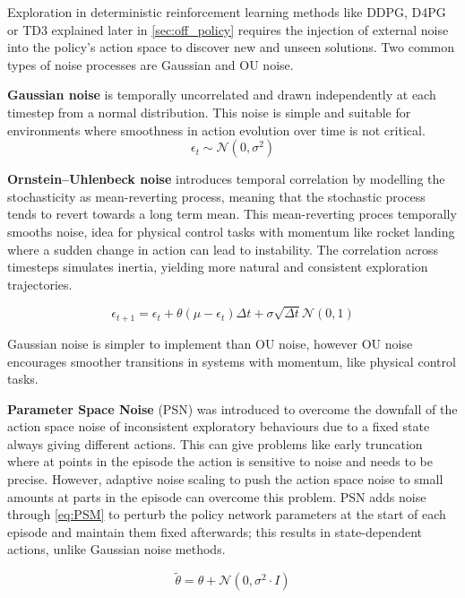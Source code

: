 \begin{tcolorbox}[title={\textbf{Lemma. Gaussian and OU noise}}]
Exploration in deterministic reinforcement learning methods like DDPG, D4PG or TD3 explained later in \autoref{sec:off_policy} requires the injection of external noise into the policy's action space to discover new and unseen solutions.  Two common types of noise processes are Gaussian and OU noise.

\textbf{Gaussian noise} is temporally uncorrelated and drawn independently at each timestep from a normal distribution. This noise is simple and suitable for environments where smoothness in action evolution over time is not critical.
\[
    \epsilon_t \sim \mathcal{N}(0, \sigma^2)
\]


\textbf{Ornstein–Uhlenbeck noise} introduces temporal correlation by modelling the stochasticity as mean-reverting process, meaning that the stochastic process tends to revert towards a long term mean. This mean-reverting proces temporally smooths noise, idea for physical control tasks with momentum like rocket landing where a sudden change in action can lead to instability. The correlation across timesteps simulates inertia, yielding more natural and consistent exploration trajectories.

\[
    \epsilon_{t+1} = \epsilon_t + \theta (\mu - \epsilon_t) \Delta t + \sigma \sqrt{\Delta t} \mathcal{N}(0, 1)
\]

Gaussian noise is simpler to implement than OU noise, however OU noise encourages smoother transitions in systems with momentum, like physical control tasks.
\end{tcolorbox}


\textbf{Parameter Space Noise} (PSN) was introduced to overcome the downfall of the action space noise of inconsistent exploratory behaviours due to a fixed state always giving different actions. This can give problems like early truncation where at points in the episode the action is sensitive to noise and needs to be precise. However, adaptive noise scaling to push the action space noise to small amounts at parts in the episode can overcome this problem. PSN adds noise through \autoref{eq:PSM} to perturb the policy network parameters at the start of each episode and maintain them fixed afterwards; this results in state-dependent actions, unlike Gaussian noise methods.

\begin{equation}
    \tilde{\theta} = \theta + \mathcal{N}(0, \sigma^2 \cdot I)
\label{eq:PSM}
\end{equation}

